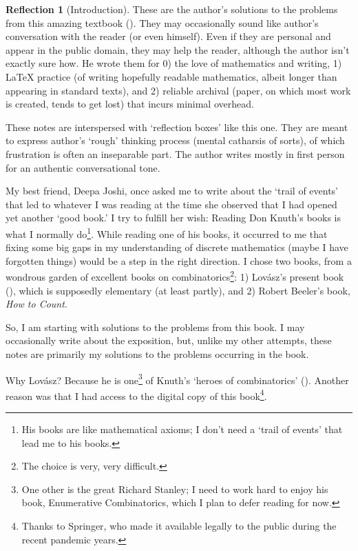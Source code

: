 \documentclass[11pt]{book}
\theoremstyle{definition}
\theoremstyle{plain}
\theoremstyle{definition}
\theoremstyle{problemstyle}
\theoremstyle{remark}
\theoremstyle{definition}
\newtheorem{reflection}{Reflection}
\begin{document}
\begin{reflection}[Introduction]
    These are the author's solutions to the problems from this amazing textbook (\cite{lovasz-etal}). They may occasionally sound like author's conversation with the reader (or even himself). Even if they are personal and appear in the public domain, they may help the reader, although the author isn't exactly sure how. He wrote them for 0) the love of mathematics and writing, 1) \LaTeX{} practice (of writing hopefully readable mathematics, albeit longer than appearing in standard texts), and 2) reliable archival (paper, on which most work is created, tends to get lost) that incurs minimal overhead.

    These notes are interspersed with `reflection boxes' like this one. They are meant to express author's `rough' thinking process (mental catharsis of sorts), of which frustration is often an inseparable part. The author writes mostly in first person for an authentic conversational tone.

    My best friend, Deepa Joshi, once asked me to write about the `trail of events' that led to whatever I was reading at the time she observed that I had opened yet another `good book.' I try to fulfill her wish: Reading Don Knuth's books is what I normally do\footnote{His books are like mathematical axioms; I don't need a `trail of events' that lead me to his books.}. While reading one of his books, it occurred to me that fixing some big gaps in my understanding of discrete mathematics (maybe I have forgotten things) would be a step in the right direction. I chose two books, from a wondrous garden of excellent books on combinatorics\footnote{The choice is very, very difficult.}: 1) Lov\'asz's present book (\cite{lovasz-etal}), which is supposedly elementary (at least partly), and 2) Robert Beeler's book, \emph{How to Count}.

    So, I am starting with solutions to the problems from this book. I may occasionally write about the exposition, but, unlike my other attempts, these notes are primarily my solutions to the problems occurring in the book.

    Why Lov\'asz? Because he is one\footnote{One other is the great Richard Stanley; I need to work hard to enjoy his book, Enumerative Combinatorics, which I plan to defer reading for now.} of Knuth's `heroes of combinatorics' (\cite{bhavana-knuth}). Another reason was that I had access to the digital copy of this book\footnote{Thanks to Springer, who made it available legally to the public during the recent pandemic years.}.

\end{reflection}
\end{document}
